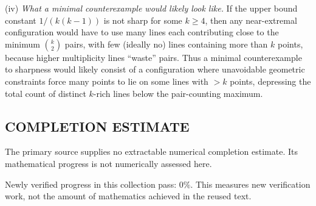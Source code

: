 \noindent(iv) \emph{What a minimal counterexample would likely look like.}
If the upper bound constant $1/(k(k-1))$ is not sharp for some $k\ge 4$, then any near-extremal configuration would have to use many lines each contributing close to the minimum $\binom{k}{2}$ pairs, with few (ideally no) lines containing more than $k$ points, because higher multiplicity lines ``waste'' pairs.
Thus a minimal counterexample to sharpness would likely consist of a configuration where unavoidable geometric constraints force many points to lie on some lines with $>k$ points, depressing the total count of distinct $k$-rich lines below the pair-counting maximum.




\subsection*{COMPLETION ESTIMATE}
The primary source supplies no extractable numerical completion estimate. Its mathematical progress is not numerically assessed here.

Newly verified progress in this collection pass: $0\%$. This measures new verification work, not the amount of mathematics achieved in the reused text.
